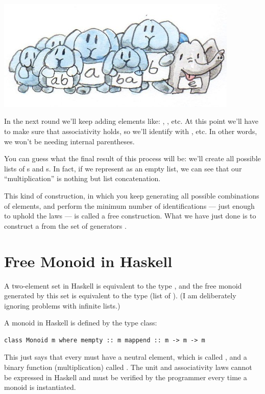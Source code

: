 \includegraphics[width=4.54167in]{images/bunnies.jpg}

In the next round we'll keep adding elements like:
, , etc. At this point we'll
have to make sure that associativity holds, so we'll identify
 with , etc. In other words,
we won't be needing internal parentheses.

You can guess what the final result of this process will be: we'll
create all possible lists of s and s. In fact, if we
represent  as an empty list, we can see that our
``multiplication'' is nothing but list concatenation.

This kind of construction, in which you keep generating all possible
combinations of elements, and perform the minimum number of
identifications --- just enough to uphold the laws --- is called a free
construction. What we have just done is to construct a  from the set of generators .

\section{Free Monoid in Haskell}\label{free-monoid-in-haskell}

A two-element set in Haskell is equivalent to the type ,
and the free monoid generated by this set is equivalent to the type
\code{{[}Bool{]}} (list of ). (I am deliberately ignoring
problems with infinite lists.)

A monoid in Haskell is defined by the type class:

\begin{Verbatim}[commandchars=\\\{\}]
class Monoid m where mempty :: m mappend :: m -> m -> m
\end{Verbatim}

This just says that every  must have a neutral element,
which is called , and a binary function (multiplication)
called . The unit and associativity laws cannot be
expressed in Haskell and must be verified by the programmer every time a
monoid is instantiated.


